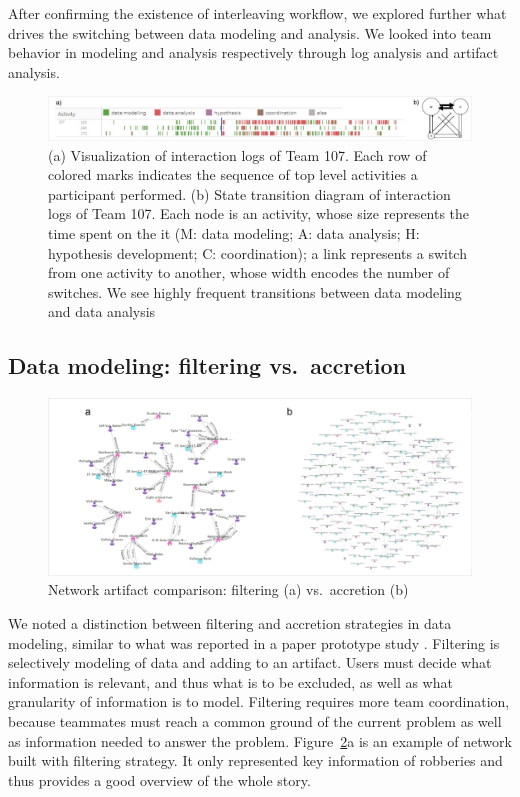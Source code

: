 After confirming the existence of interleaving workflow, we explored further what drives the switching between data modeling and analysis. We looked into team behavior in modeling and analysis respectively through log analysis and artifact analysis.

\begin{figure}
\centering
\includegraphics[width=6.5in]{./img/intertwined.jpg}
\caption{(a) Visualization of interaction logs of Team 107. Each row of
colored marks indicates the sequence of top level activities a
participant performed. (b) State transition diagram of interaction logs of Team 107. Each node is an activity, whose size represents the time spent on the it (M: data modeling; A: data analysis; H: hypothesis development; C: coordination); a
link represents a switch from one activity to another, whose width
encodes the number of switches. We see highly frequent transitions between data modeling and data analysis \label{fig:interleaving}}
\end{figure}


\subsection{Data modeling: filtering vs.~accretion}\label{data-modeling-accretion-vs.filtering}

\begin{figure}
\centering
\includegraphics[width=\columnwidth]{./img/network_accretion_filter.png}
\caption{Network artifact comparison: filtering (a)
vs.~accretion (b) \label{fig:network_accretion}}
\end{figure}

We noted a distinction between filtering and accretion
strategies in data modeling, similar to what was reported in a paper prototype study \cite{Carroll2013}. Filtering is selectively modeling of data
and adding to an artifact. Users must decide what information is
relevant, and thus what is to be excluded, as well as what granularity
of information is to model. Filtering requires more team coordination,
because teammates must reach a common ground of the current problem as
well as information needed to answer the problem. Figure~\ref{fig:network_accretion}a is an example of network built with filtering strategy. It only represented key information of robberies and thus provides a good overview of the whole story.

